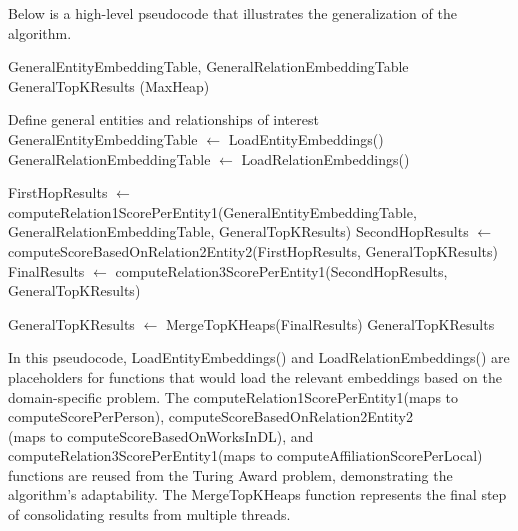 \documentclass[sigconf]{acmart}
\begin{document}
Below is a high-level pseudocode that illustrates the generalization of the algorithm.
\begin{algorithm*}
\caption{Generalized Three-Hop Reasoning Algorithm}
\begin{algorithmic}[1]
\scriptsize
\Require GeneralEntityEmbeddingTable, GeneralRelationEmbeddingTable
\Ensure GeneralTopKResults (MaxHeap)

    \State Define general entities and relationships of interest
    \State GeneralEntityEmbeddingTable $\gets$ LoadEntityEmbeddings()
    \State GeneralRelationEmbeddingTable $\gets$ LoadRelationEmbeddings()
    
    \State FirstHopResults $\gets$ computeRelation1ScorePerEntity1(GeneralEntityEmbeddingTable, GeneralRelationEmbeddingTable, GeneralTopKResults)
    \State SecondHopResults $\gets$ computeScoreBasedOnRelation2Entity2(FirstHopResults, GeneralTopKResults)
    \State FinalResults $\gets$ computeRelation3ScorePerEntity1(SecondHopResults, GeneralTopKResults)
    
    \State GeneralTopKResults $\gets$ MergeTopKHeaps(FinalResults)
    \State \Return GeneralTopKResults
\EndFunction
\end{algorithmic}
\label{algo:GeneralizedMHR}
\end{algorithm*}
In this pseudocode, LoadEntityEmbeddings() and LoadRelationEmbeddings() are placeholders for functions that would load the relevant embeddings based on the domain-specific problem. The computeRelation1ScorePerEntity1(maps to computeScorePerPerson), computeScoreBasedOnRelation2Entity2\\(maps to computeScoreBasedOnWorksInDL), and computeRelation3ScorePerEntity1(maps to computeAffiliationScorePerLocal) functions are reused from the Turing Award problem, demonstrating the algorithm's adaptability. The MergeTopKHeaps function represents the final step of consolidating results from multiple threads.
\end{document}
